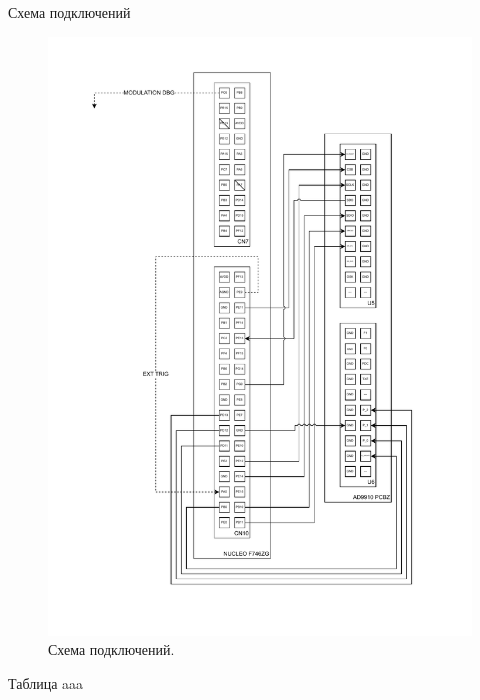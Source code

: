 \documentclass[rusmathsym, eqnumwithinsec, amspack, hyperref]{bomgost}
\begin{document}
\begin{gostappendix}{Схема подключений}
\renewcommand{\thesection}{\Alph{section}}
\renewcommand{\thesubsection}{subsection}
\setcounter{section}{1}
\setcounter{figure}{0}
\begin{gostfigure}
\begin{figure}[H]
\centering
\includegraphics[scale=.75]{data/wiring_diagram.drawio.pdf}
\caption{Схема подключений.}
\label{fig:wiring_diagram}
\end{figure}
\end{gostfigure}
\end{gostappendix}


\begin{gostappendix}{Таблица}
aaa
\end{gostappendix}
\end{document}

